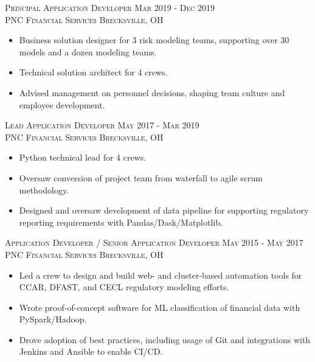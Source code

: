 \documentclass[letterpaper, 10pt]{article} %
\begin{document}
\textsc{Principal Application Developer \hfill Mar 2019 - Dec 2019} \\
\textsc{PNC Financial Services \hfill Brecksville, OH}
\begin{itemize}
 \item Business solution designer for 3 risk modeling teams, supporting over 30 models and a dozen modeling teams.
 \item Technical solution architect for 4 crews.
 \item Advised management on personnel decisions, shaping team culture and employee development.
\end{itemize}

\textsc{Lead Application Developer \hfill May 2017 - Mar 2019} \\
\textsc{PNC Financial Services \hfill Brecksville, OH}
\begin{itemize}
 \item Python technical lead for 4 crews.
 \item Oversaw conversion of project team from waterfall to agile scrum methodology.
 \item Designed and oversaw development of data pipeline for supporting regulatory reporting requirements with Pandas/Dask/Matplotlib.
\end{itemize}

 \textsc{Application Developer / Senior Application Developer \hfill May 2015 - May 2017} \\
\textsc{PNC Financial Services \hfill Brecksville, OH}
\begin{itemize}
 \item Led a crew to design and build web- and cluster-based automation tools for CCAR, DFAST, and CECL regulatory modeling efforts.
 \item Wrote proof-of-concept software for ML classification of financial data with PySpark/Hadoop.
 \item Drove adoption of best practices, including usage of Git and integrations with Jenkins and Ansible to enable CI/CD.
\end{itemize}
\end{document}
